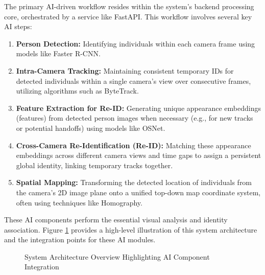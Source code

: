 The primary AI-driven workflow resides within the system's backend processing core, orchestrated by a service like FastAPI. This workflow involves several key AI steps:
\begin{enumerate}
    \item \textbf{Person Detection:} Identifying individuals within each camera frame using models like Faster R-CNN.
    \item \textbf{Intra-Camera Tracking:} Maintaining consistent temporary IDs for detected individuals within a single camera's view over consecutive frames, utilizing algorithms such as ByteTrack.
    \item \textbf{Feature Extraction for Re-ID:} Generating unique appearance embeddings (features) from detected person images when necessary (e.g., for new tracks or potential handoffs) using models like OSNet.
    \item \textbf{Cross-Camera Re-Identification (Re-ID):} Matching these appearance embeddings across different camera views and time gaps to assign a persistent global identity, linking temporary tracks together.
    \item \textbf{Spatial Mapping:} Transforming the detected location of individuals from the camera's 2D image plane onto a unified top-down map coordinate system, often using techniques like Homography.
\end{enumerate}
These AI components perform the essential visual analysis and identity association. Figure \ref{fig:ai-architecture-overview} provides a high-level illustration of this system architecture and the integration points for these AI modules.

\begin{figure}[!htb] %
    \centering
    \caption{System Architecture Overview Highlighting AI Component Integration}
    \label{fig:ai-architecture-overview}
\end{figure}
\clearpage %

